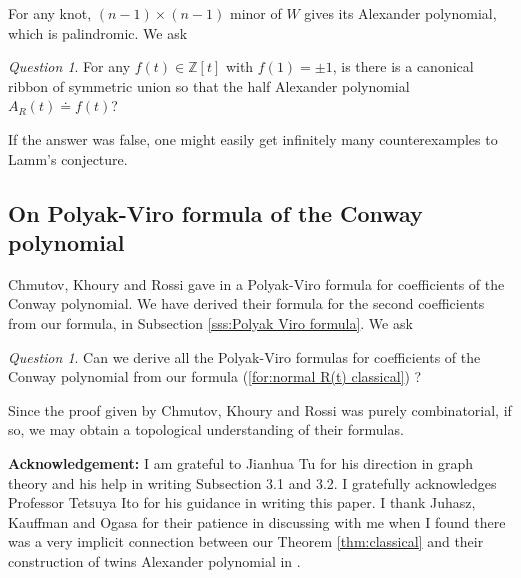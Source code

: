 \documentclass{amsart}
\theoremstyle{definition}
\theoremstyle{remark}
\newtheorem{Question}[thm]{Question}
\numberwithin{equation}{subsection}
\begin{document}
For any knot, $(n-1)\times(n-1)$ minor of $W$ gives its Alexander polynomial, which is palindromic. We ask

\begin{Question}
For any $f(t)\in\mathbb{Z}[t]$ with $f(1)=\pm 1$, is there is a canonical ribbon of symmetric union so that the half Alexander polynomial $A_{R}(t)\doteq f(t)$?
\end{Question}

If the answer was false, one might easily get infinitely many counterexamples to Lamm's conjecture.

\subsection{On Polyak-Viro formula of the Conway polynomial}
Chmutov, Khoury and Rossi gave in \cite{ChmutovKhouryRossi2009} a Polyak-Viro formula for coefficients of the Conway polynomial. We have derived their formula for the second coefficients from our formula, in Subsection \ref{sss:Polyak Viro formula}. We ask

\begin{Question}
Can we derive all the Polyak-Viro formulas for coefficients of the Conway polynomial from our formula (\ref{for:normal R(t) classical}) ?
\end{Question}

Since the proof given by Chmutov, Khoury and Rossi was purely combinatorial, if so, we may obtain a topological understanding of their formulas.

\quad



\textbf{Acknowledgement:}
I am grateful to Jianhua Tu for his direction in graph theory and his help in writing Subsection 3.1 and 3.2. I gratefully acknowledges Professor Tetsuya Ito for his guidance in writing this paper. I thank Juhasz, Kauffman and Ogasa for their patience in discussing with me when I found there was a very implicit connection between our Theorem \ref{thm:classical} and their construction of twins Alexander polynomial in \cite{JuhaszKauffmanOgasa2022}.
\end{document}
